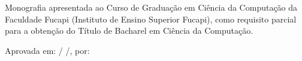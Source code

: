 \documentclass[
	12pt,				%
	openright,			%
	oneside,	
	a4paper,				%
	english,				%
	brazil				%
]{abntex2/abntex2} %
\begin{document}
\begin{folhadeaprovacao}
	\parindent=0pt
	\setlength{\ABNTEXsignskip}{1.5cm}
	
	\begin{center}
		
		{\fontsize{12}{15}\selectfont\imprimirautor}
		\vspace*{\fill}
		\begin{center}
			\fontsize{12}{15}\selectfont\imprimirtitulo
		\end{center}
		\vspace*{\fill}
	\end{center}	

	Monografia apresentada ao Curso de Graduação em Ciência da Computação da Faculdade Fucapi (Instituto de Ensino Superior Fucapi), como requisito parcial para a obtenção do Título de Bacharel em Ciência da Computação.
	
	Aprovada em: \hspace*{0.8cm}/ \hspace*{0.8cm}/\hspace*{1.2cm}, por:

	\vspace{1cm}

	\vspace{1cm}
	\vfill
    
	\begin{center}
		\fontsize{12}{15}\selectfont
		\vspace*{0.5cm}
		\imprimirlocal
		\\
		\imprimirdata
		\vspace*{1cm}
	\end{center}
  
 \end{folhadeaprovacao}
\end{document}
